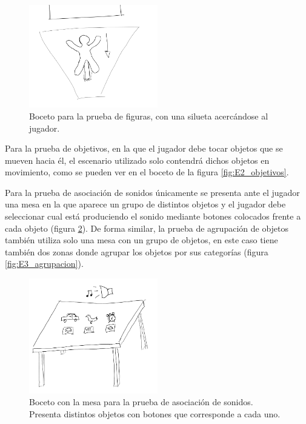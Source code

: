 \begin{figure}
  \centering
    \includegraphics[width=0.5\textwidth]{04.Desarrollo/03.Entrega3/01.Iteracion3_1/00.Figuras/08.figuras.png}
    \caption{Boceto para la prueba de figuras, con una silueta acercándose al jugador.}
    \label{fig:E3_figuras}
\end{figure}

Para la prueba de objetivos, en la que el jugador debe tocar objetos que se mueven hacia él, el escenario utilizado solo contendrá dichos objetos en movimiento, como se pueden ver en el boceto de la figura \ref{fig:E2_objetivos}.



Para la prueba de asociación de sonidos únicamente se presenta ante el jugador una mesa en la que aparece un grupo de distintos objetos y el jugador debe seleccionar cual está produciendo el sonido mediante botones colocados frente a cada objeto (figura \ref{fig:E3_sonidos}). De forma similar, la prueba de agrupación de objetos también utiliza solo una mesa con un grupo de objetos, en este caso tiene también dos zonas donde agrupar los objetos por sus categorías (figura \ref{fig:E3_agrupacion}).

\begin{figure}
  \centering
    \includegraphics[width=0.5\textwidth]{04.Desarrollo/03.Entrega3/01.Iteracion3_1/00.Figuras/09.sonidos.png}
    \caption{Boceto con la mesa para la prueba de asociación de sonidos. Presenta distintos objetos con botones que corresponde a cada uno.}
    \label{fig:E3_sonidos}
\end{figure}

